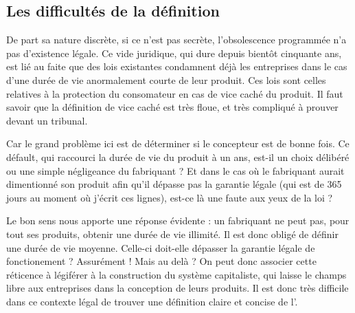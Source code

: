 \subsection{Les difficultés de la définition}

De part sa nature discrète, si ce n'est pas secrète, l'obsolescence programmée n'a pas d'existence légale. Ce vide juridique, qui dure depuis bientôt cinquante ans, est lié au faite que des lois existantes condamnent déjà les entreprises dans le cas d'une durée de vie anormalement courte de leur produit. Ces lois sont celles relatives à la protection du consomateur en cas de vice caché du produit. Il faut savoir que la définition de vice caché est très floue, et très compliqué à prouver devant un tribunal.

Car le grand problème ici est de déterminer si le concepteur est de bonne fois. Ce défault, qui raccourci la durée de vie du produit à un ans, est-il un choix délibéré ou une simple négligeance du fabriquant ? Et dans le cas où le fabriquant aurait dimentionné son produit afin qu'il dépasse pas la garantie légale (qui est de 365 jours au moment où j'écrit ces lignes), est-ce là une faute aux yeux de la loi ?

Le bon sens nous apporte une réponse évidente : un fabriquant ne peut pas, pour tout ses produits, obtenir une durée de vie illimité. Il est donc obligé de définir une durée de vie moyenne. Celle-ci doit-elle dépasser la garantie légale de fonctionement ? Assurément ! Mais au delà ?
\medbreack
On peut donc associer cette réticence à légiférer à la construction du système capitaliste, qui laisse le champs libre aux entreprises dans la conception de leurs produits. 
Il est donc très difficile dans ce contexte légal de trouver une définition claire et concise de l'\OP.
